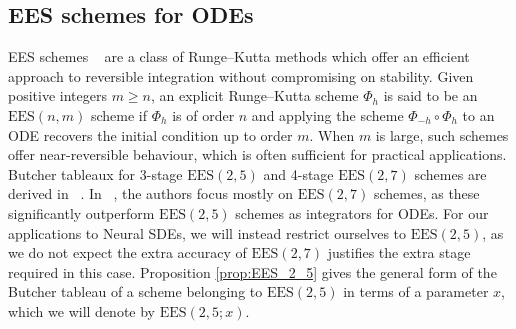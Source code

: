 \documentclass{article} %
\theoremstyle{definition}
\theoremstyle{remark}
\newtheorem{theorem}{Theorem}[section]
\begin{document}



\subsection{EES schemes for ODEs}\label{sec:ees_rdes_subsec}

EES schemes ~\citep{shmelev2025explicit} are a class of Runge--Kutta methods which offer an efficient approach to reversible integration without compromising on stability. Given positive integers $m \geq n$, an explicit Runge--Kutta scheme $\Phi_h$ is said to be an $\mathrm{EES}(n,m)$ scheme if $\Phi_h$ is of order $n$ and applying the scheme $\Phi_{-h} \circ \Phi_h$ to an ODE recovers the initial condition up to order $m$. When $m$ is large, such schemes offer near-reversible behaviour, which is often sufficient for practical applications. Butcher tableaux for 3-stage $\mathrm{EES}(2,5)$ and 4-stage $\mathrm{EES}(2,7)$ schemes are derived in ~\cite{shmelev2025explicit}. In ~\cite{shmelev2025explicit}, the authors focus mostly on $\mathrm{EES}(2,7)$ schemes, as these significantly outperform $\mathrm{EES}(2,5)$ schemes as integrators for ODEs. For our applications to Neural SDEs, we will instead restrict ourselves to $\mathrm{EES}(2,5)$, as we do not expect the extra accuracy of $\mathrm{EES}(2,7)$ justifies the extra stage required in this case. Proposition \ref{prop:EES_2_5} gives the general form of the Butcher tableau of a scheme belonging to $\mathrm{EES}(2,5)$ in terms of a parameter $x$, which we will denote by $\mathrm{EES}(2,5;x)$.
\end{document}
